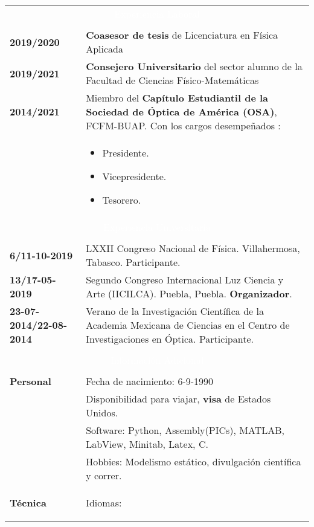 \documentclass[twoside,letter,openright,10pt]{report}
\begin{document}
\begin{table}[hbt!]
\begin{tabular}{p{40mm}p{140mm}}
\multicolumn{2}{c}{\cellcolor{black} \textcolor{white}{Experiencia Laboral}}
\\
\\
\textbf{2019/2020} & \textbf{Coasesor de tesis} de Licenciatura en Física Aplicada
\\
\textbf{2019/2021} & \textbf{Consejero Universitario} del sector alumno de la Facultad de Ciencias Físico-Matemáticas
\\
\textbf{2014/2021} & Miembro del \textbf{Capítulo Estudiantil de la Sociedad de Óptica de América (OSA)}, FCFM-BUAP. Con los cargos desempeñados :\\
& \vspace{-2mm} \begin{itemize}[noitemsep,nolistsep]
\item Presidente.
\item Vicepresidente.
\item Tesorero.
\vspace{-4mm}
\end{itemize}
\\
\multicolumn{2}{c}{\cellcolor{black} \textcolor{white}{Experiencia Universitaria}}
\\
\\
\textbf{6/11-10-2019} &LXXII Congreso Nacional de Física. Villahermosa, Tabasco. Participante.
\\
\textbf{13/17-05-2019} &Segundo Congreso Internacional Luz Ciencia y Arte (IICILCA). Puebla, Puebla. \textbf{Organizador}.
\\
\textbf{23-07-2014/22-08-2014} & Verano de la Investigación Científica de la Academia Mexicana de Ciencias en el Centro de Investigaciones en Óptica. Participante.
\\
\\
\multicolumn{2}{c}{\cellcolor{black} \textcolor{white}{Información Adicional}}
\\
\\
\textbf{Personal} &  Fecha de nacimiento: 6-9-1990
\\
& Disponibilidad para viajar, \textbf{visa} de Estados Unidos.
\\
& Software: Python, Assembly(PICs), MATLAB, LabView, Minitab, Latex, C.
\\
& Hobbies: Modelismo estático, divulgación científica y correr.
\\
\textbf{Técnica}
& Idiomas:
\begin{itemize}

\end{itemize}
\end{tabular}
\end{table}
\end{document}
